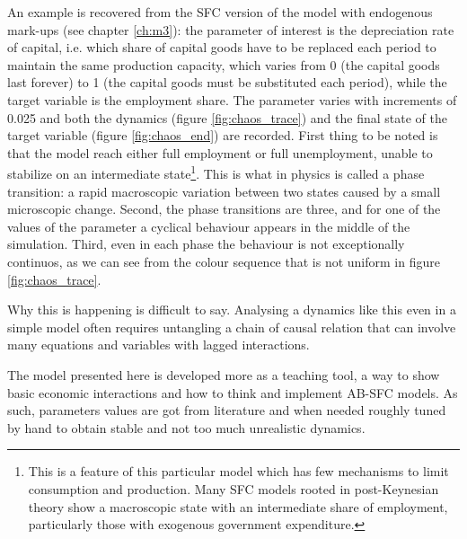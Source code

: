 An example is recovered from the SFC version of the model with endogenous mark-ups (see chapter \ref{ch:m3}): the parameter of interest is the depreciation rate of capital, i.e. which share of capital goods have to be replaced each period to maintain the same production capacity, which varies from 0 (the capital goods last forever) to 1 (the capital goods must be substituted each period), while the target variable is the employment share.
The parameter varies with increments of 0.025 and both the dynamics (figure \ref{fig:chaos_trace}) and the final state of the target variable (figure \ref{fig:chaos_end}) are recorded.
First thing to be noted is that the model reach either full employment or full unemployment, unable to stabilize on an intermediate state\footnote{This is a feature of this particular model which has few mechanisms to limit consumption and production. Many SFC models rooted in post-Keynesian theory show a macroscopic state with an intermediate share of employment, particularly those with exogenous government expenditure.}.
This is what in physics is called a phase transition: a rapid macroscopic variation between two states caused by a small microscopic change.
Second, the phase transitions are three, and for one of the values of the parameter a cyclical behaviour appears in the middle of the simulation.
Third, even in each phase the behaviour is not exceptionally continuos, as we can see from the colour sequence that is not uniform in figure \ref{fig:chaos_trace}.

Why this is happening is difficult to say.
Analysing a dynamics like this even in a simple model often requires untangling a chain of causal relation that can involve many equations and variables with lagged interactions.

The model presented here is developed more as a teaching tool, a way to show basic economic interactions and how to think and implement AB-SFC models.
As such, parameters values are got from literature and when needed roughly tuned by hand to obtain stable and not too much unrealistic dynamics.
